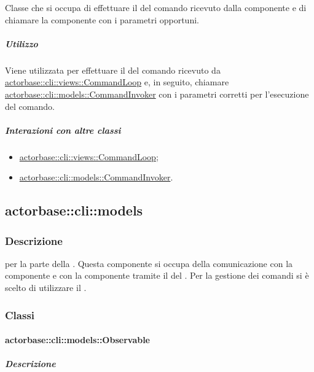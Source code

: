 \documentclass{scalatekids-article}
\begin{document}
Classe che si occupa di effettuare il  del comando ricevuto
dalla componente  e di chiamare la componente  con i
parametri opportuni.

\subparagraph{Utilizzo}

Viene utilizzata per effettuare il  del comando ricevuto da
\hyperref[sec:actorbase::cli::views::CommandLoop]{actorbase::cli::views::CommandLoop} e, in seguito, chiamare
\hyperref[sec:actorbase::cli::models::CommandInvoker]{actorbase::cli::models::CommandInvoker} con i parametri corretti per
l'esecuzione del comando.

\subparagraph{Interazioni con altre classi}

\begin{itemize}
\item \hyperref[sec:actorbase::cli::views::CommandLoop]{actorbase::cli::views::CommandLoop};
\item \hyperref[sec:actorbase::cli::models::CommandInvoker]{actorbase::cli::models::CommandInvoker}.
\end{itemize}

\subsection{actorbase::cli::models}
\label{sec:actorbase::cli::models}

\subsubsection{Descrizione}

 per la parte  della . Questa
componente si occupa della comunicazione con la componente  e
con la componente  tramite il  del  . Per la gestione dei comandi si è scelto di
utilizzare il .

\subsubsection{Classi}

\paragraph{actorbase::cli::models::Observable}
\label{sec:actorbase::cli::models::Observable}

\subparagraph{Descrizione}
\end{document}
